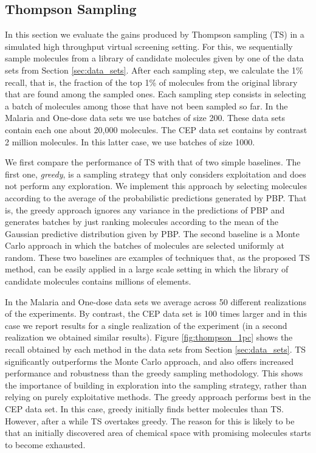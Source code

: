 \subsection{Thompson Sampling}

In this section we evaluate the gains produced by Thompson sampling (TS) in a simulated high throughput virtual screening setting. For this, we sequentially sample molecules from a library of candidate molecules given by one of the data sets from Section \ref{sec:data_sets}. After each sampling step, we calculate the 1\% recall, that is, the fraction of the top 1\% of molecules from the original library that are found among the sampled ones. Each sampling step consists in selecting a batch of molecules among those that have not been sampled so far. In the Malaria and One-dose data sets we use batches of size 200. These data sets contain each one about 20,000 molecules. The CEP data set contains by contrast 2 million molecules. In this latter case, we use batches of size 1000. 

We first compare the performance of TS with that of two simple baselines. The first one, \emph{greedy}, is a sampling strategy that only considers exploitation and does not perform any exploration. We implement this approach by selecting molecules according to the average of the probabilistic predictions generated by PBP. That is, the greedy approach ignores any variance in the predictions of PBP and generates batches by just ranking molecules according to the mean of the Gaussian predictive distribution given by PBP. The second baseline is a Monte Carlo approach in which the batches of molecules are selected uniformly at random. These two baselines are examples of techniques that, as the proposed TS method, can be easily applied in a large scale setting in which the library of candidate molecules contains millions of elements.

In the Malaria and One-dose data sets we average across 50 different realizations of the experiments. By contrast, the CEP data set is 100 times larger and in this case we report results for a single realization of the experiment (in a second realization we obtained similar results). 
Figure \ref{fig:thompson_1pc} shows the recall obtained by each method in the data sets from 
Section \ref{sec:data_sets}. TS significantly outperforms the Monte Carlo approach, and also offers increased performance and robustness than the greedy sampling methodology. This shows the importance of building in exploration into the sampling strategy, rather than relying on purely exploitative methods. The greedy approach performs best in the CEP data set. In this case, greedy initially finds better molecules than TS. However, after a while TS overtakes greedy. The reason for this is likely to be that an initially discovered area of chemical space with promising molecules starts to become exhausted.

